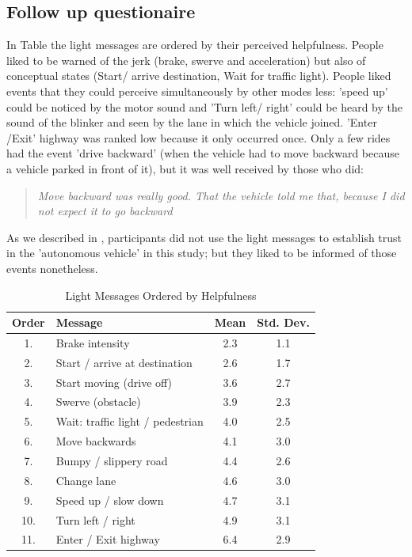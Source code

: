 
\subsection{Follow up questionaire}
In Table \emph{} the light messages are ordered by their perceived helpfulness. People liked to be warned of the jerk (brake, swerve and acceleration) but also of conceptual states (Start/ arrive destination, Wait for traffic light). People liked events that they could perceive simultaneously by other modes less: 'speed up' could be noticed by the motor sound and 'Turn left/ right' could be heard by the sound of the blinker and seen by the lane in which the vehicle joined. 'Enter /Exit' highway was ranked low because it only occurred once. Only a few rides had the event 'drive backward' (when the vehicle had to move backward because a vehicle parked in front of it), but it was well received by those who did: \begin{quotation}\emph{Move backward was really good. That the vehicle told me that, because I did not expect it to go backward}\end{quotation} As we described in \emph{}, participants did not use the light messages to establish trust in the 'autonomous vehicle' in this study; but they liked to be informed of those events nonetheless. 

\begin{table}
  \caption{Light Messages Ordered by Helpfulness}
  \label{tab:order}
  \begin{tabular}[t]{clcc}
    \toprule
    Order & Message & Mean & Std. Dev.\\
    \midrule
1.  & Brake intensity                     & 2.3 & 1.1 \\
2.  & Start / arrive  at destination       & 2.6 & 1.7 \\
3.  & Start moving (drive off)            & 3.6 & 2.7 \\
4.  & Swerve (obstacle)                   & 3.9 & 2.3 \\
5.  & Wait: traffic light / pedestrian & 4.0 & 2.5 \\
6.  & Move backwards                      & 4.1 & 3.0 \\
7.  & Bumpy  / slippery road               & 4.4 & 2.6 \\
8.  & Change lane                         & 4.6 & 3.0 \\
9.  & Speed up / slow down                & 4.7 & 3.1 \\
10. & Turn left / right                   & 4.9 & 3.1 \\
11. & Enter / Exit highway                & 6.4 & 2.9
\end{tabular}
\end{table}

